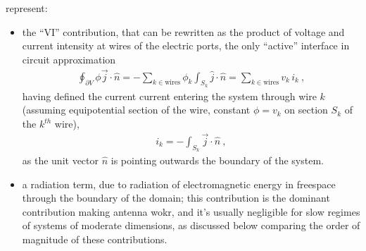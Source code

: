\documentclass[letterpaper,10pt,english]{jupyterBook}
\begin{document}
\sphinxAtStartPar
{} represent:
\begin{itemize}
\item {} 
\sphinxAtStartPar
the “VI” contribution, that can be re\sphinxhyphen{}written as the product of voltage and current intensity at wires of the electric ports, the only “active” interface in circuit approximation
\begin{equation*}
\begin{split}\oint_{\partial V} \phi \vec{j} \cdot \hat{n} = - \sum_{k \in \text{wires}} \phi_k \int_{S_k} \hat{j} \cdot \hat{n} = \sum_{k \in \text{wires}} v_k \, i_k \ ,\end{split}
\end{equation*}
\sphinxAtStartPar
having defined the current current entering the system through wire \(k\) (assuming equipotential section of the wire, constant \(\phi = v_k\) on section \(S_k\) of the \(k^{th}\) wire),
\begin{equation*}
\begin{split}i_k = - \int_{S_k} \vec{j} \cdot \hat{n} \ ,\end{split}
\end{equation*}
\sphinxAtStartPar
as the unit vector \(\hat{n}\) is pointing outwards the boundary of the system.

\item {} 
\sphinxAtStartPar
a radiation term, due to radiation of electromagnetic energy in free\sphinxhyphen{}space through the boundary of the domain; this contribution is the dominant contribution making antenna wokr, and it’s usually negligible for slow regimes of systems of moderate dimensions, as discussed below comparing the order of magnitude of these contributions.

\end{itemize}
\end{document}
